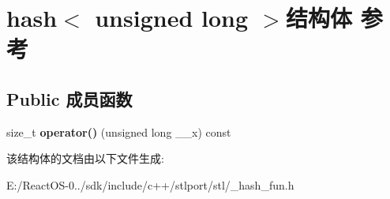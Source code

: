 \hypertarget{structhash_3_01unsigned_01long_01_4}{}\section{hash$<$ unsigned long $>$结构体 参考}
\label{structhash_3_01unsigned_01long_01_4}
\subsection*{Public 成员函数}
\begin{DoxyCompactItemize}
\item 
\mbox{\label{structhash_3_01unsigned_01long_01_4_a684f6b8ea8ac43595c28ac88279f57d0}} 
size\+\_\+t {\bfseries operator()} (unsigned long \+\_\+\+\_\+x) const
\end{DoxyCompactItemize}


该结构体的文档由以下文件生成\+:\begin{DoxyCompactItemize}
\item 
E\+:/\+React\+O\+S-\/0../sdk/include/c++/stlport/stl/\+\_\+hash\+\_\+fun.\+h\end{DoxyCompactItemize}
